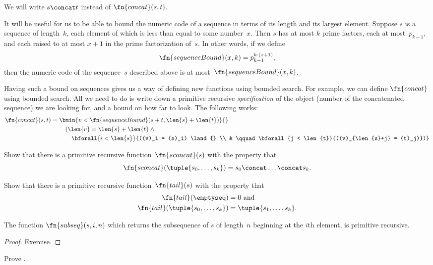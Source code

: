 \documentclass[../../../include/open-logic-section]{subfiles}
\begin{document}
We will write $s \concat t$ instead of $\fn{concat}(s,t)$.

It will be useful for us to be able to bound the numeric code of a
sequence in terms of its length and its largest element. Suppose $s$
is a sequence of length~$k$, each element of which is less than equal
to some number~$x$. Then $s$ has at most $k$ prime factors, each at
most~$p_{k-1}$, and each raised to at most $x+1$ in the prime
factorization of~$s$. In other words, if we define
\[
\fn{sequenceBound}(x,k) = p_{k-1}^{k \cdot (x+1)},
\]
then the numeric code of the sequence~$s$ described above is at
most~$\fn{sequenceBound}(x,k)$.

Having such a bound on sequences gives us a way of defining new
functions using bounded search. For example, we can define
$\fn{concat}$ using bounded search. All we need to do is write down a
primitive recursive \emph{specification} of the object (number of the
concatenated sequence) we are looking for, and a bound on how far to
look. The following works:
\begin{align*}
  \fn{concat}(s,t) = {} & \bmin{v < \fn{sequenceBound}(s+t,\len{s} +
    \len{t})}{} \\
  & \quad(\len{v} = \len{s} + \len{t} \land {}\\
    & \qquad \bforall{i < \len{s}}{((v)_i = (s)_i) \land {} \\
      & \qquad \bforall{j < \len{t}}{((v)_{\len{s}+j} = (t)_j)})}
\end{align*}

\begin{prob}
Show that there is a primitive recursive function~$\fn{sconcat}(s)$
with the property that
\[
\fn{sconcat}(\tuple{s_0, \dots, s_k}) = s_0 \concat \dots \concat s_k.
\]
\end{prob}

\begin{prob}
Show that there is a primitive recursive function~$\fn{tail}(s)$
with the property that
\begin{align*}
  \fn{tail}(\emptyseq) & = 0 \text{ and}\\
  \fn{tail}(\tuple{s_0, \dots, s_{k}}) & = \tuple{s_1, \dots, s_{k}}.
\end{align*}
\end{prob}

\begin{prop}
  The function $\fn{subseq}(s, i, n)$ which returns the subsequence
  of $s$ of length~$n$ beginning at the $i$th element, is primitive
  recursive.
\end{prop}

\begin{proof}
  Exercise.
\end{proof}

\begin{prob}
  Prove .
\end{prob}
  
\end{document}
